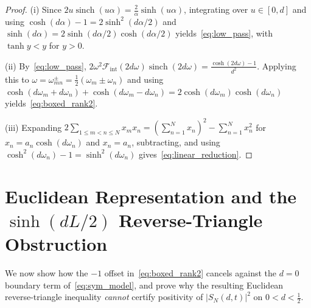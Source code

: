 \documentclass[11pt,reqno]{amsart}
\theoremstyle{definition}
\theoremstyle{remark}
\numberwithin{equation}{section}
\DeclareMathOperator{\sinch}{sinch}
\begin{document}
\begin{proof}
(i) Since $2u\sinch(u\alpha) = \frac{2}{\alpha}\sinh(u\alpha)$, integrating over $u \in [0, d]$ and using $\cosh(d\alpha) - 1 = 2\sinh^2(d\alpha/2)$ and $\sinh(d\alpha) = 2\sinh(d\alpha/2)\cosh(d\alpha/2)$ yields~\eqref{eq:low_pass}, with $\tanh y < y$ for $y > 0$.

(ii) By~\eqref{eq:low_pass}, $2\omega^2\mathcal{F}_{\mathrm{int}}(2d\omega)\sinch(2d\omega) = \frac{\cosh(2d\omega)-1}{d^2}$. Applying this to $\omega = \omega_{mn}^\pm = \frac{1}{2}(\omega_m \pm \omega_n)$ and using $\cosh(d\omega_m + d\omega_n) + \cosh(d\omega_m - d\omega_n) = 2\cosh(d\omega_m)\cosh(d\omega_n)$ yields~\eqref{eq:boxed_rank2}.

(iii) Expanding $2\sum_{1 \le m < n \le N} x_m x_n = (\sum_{n=1}^N x_n)^2 - \sum_{n=1}^N x_n^2$ for $x_n = a_n\cosh(d\omega_n)$ and $x_n = a_n$, subtracting, and using $\cosh^2(d\omega_n) - 1 = \sinh^2(d\omega_n)$ gives~\eqref{eq:linear_reduction}.
\end{proof}

\section{Euclidean Representation and the $\sinh(dL/2)$ Reverse-Triangle Obstruction}\label{sec:reverse_triangle}

We now show how the $-1$ offset in~\eqref{eq:boxed_rank2} cancels against the $d = 0$ boundary term of~\eqref{eq:sym_model}, and prove why the resulting Euclidean reverse-triangle inequality \emph{cannot} certify positivity of $\lvert S_N(d,t)\rvert^2$ on $0 < d < \frac{1}{2}$.
\end{document}
